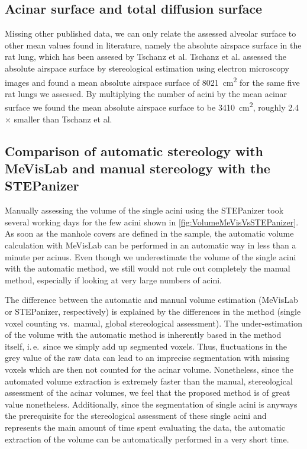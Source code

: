 \documentclass[twoside,paper=a4,abstract=true,english,DIVcalc]{scrartcl}
\newcommand{\ie}{i.\,e.\ }
\begin{document}
\subsection{Acinar surface and total diffusion surface}
Missing other published data, we can only relate the assessed alveolar surface to other mean values found in literature, namely the absolute airspace surface in the rat lung, which has been assesed by Tschanz et al. Tschanz et al. assessed the absolute airspace surface by stereological estimation using electron microscopy images and found a mean absolute airspace surface of \SI{8021}{\centi\metre\squared} for the same five rat lungs we assessed. By multiplying the number of acini by the mean acinar surface we found the mean absolute airspace surface to be \SI{3410}{\centi\metre\squared}, roughly 2.4\(\times\) smaller than Tschanz et al.

\subsection[Comparison of MeVisLab with STEPanizer]{Comparison of automatic stereology with MeVisLab and manual stereology with the STEPanizer}
Manually assessing the volume of the single acini using the STEPanizer took several working days for the few acini shown in \autoref{fig:VolumeMeVisVsSTEPanizer}. As soon as the manhole covers are defined in the sample, the automatic volume calculation with MeVisLab can be performed in an automatic way in less than a minute per acinus. Even though we underestimate the volume of the single acini with the automatic method, we still would not rule out completely the manual method, especially if looking at very large numbers of acini.

The difference between the automatic and manual volume estimation (MeVisLab or STEPanizer, respectively) is explained by the differences in the method (single voxel counting vs.\ manual, global stereological assessment). The under-estimation of the volume with the automatic method is inherently based in the method itself, \ie since we simply add up segmented voxels. Thus, fluctuations in the grey value of the raw data can lead to an imprecise segmentation with missing voxels which are then not counted for the acinar volume. Nonetheless, since the automated volume extraction is extremely faster than the manual, stereological assessment of the acinar volumes, we feel that the proposed method is of great value nonetheless. Additionally, since the segmentation of single acini is anyways the prerequisite for the stereological assessment of these single acini and represents the main amount of time spent evaluating the data, the automatic extraction of the volume can be automatically performed in a very short time.
\end{document}
